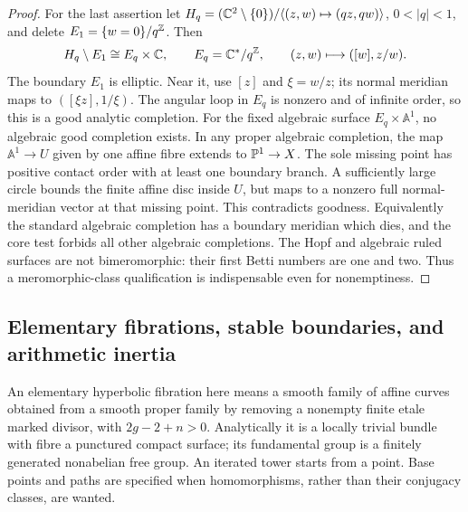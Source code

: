 \begin{proof}
For the last assertion let
$H_q=(\mathbb C^2\setminus\{0\})/\langle(z,w)\mapsto(qz,qw)\rangle$,
$0<|q|<1$, and delete $E_1=\{w=0\}/q^\mathbb Z$.
Then
\[
 H_q\setminus E_1\cong E_q\times\mathbb C,\qquad
 E_q=\mathbb C^*/q^\mathbb Z,\qquad
 (z,w)\longmapsto([w],z/w).
\]
The boundary $E_1$ is elliptic. Near it, use $[z]$ and
$\xi=w/z$; its normal meridian maps to
$([\xi z],1/\xi)$. The angular loop in $E_q$ is nonzero
and of infinite order, so this is a good analytic completion.
For the fixed algebraic surface $E_q\times\mathbb A^1$, no
algebraic good completion exists. In any proper algebraic
completion, the map $\mathbb A^1\to U$ given by one affine
fibre extends to $\mathbb P^1\to X$. The sole missing point has
positive contact order with at least one boundary branch.
A sufficiently large circle bounds the finite affine disc
inside $U$, but maps to a nonzero full normal-meridian
vector at that missing point. This contradicts goodness.
Equivalently the standard algebraic completion has a
boundary meridian which dies, and the core test forbids all
other algebraic completions. The Hopf and algebraic ruled
surfaces are not bimeromorphic: their first Betti numbers
are one and two. Thus a meromorphic-class qualification
is indispensable even for nonemptiness.
\end{proof}

\subsection{Elementary fibrations, stable boundaries, and arithmetic inertia}

An elementary hyperbolic fibration here means a smooth family of affine
curves obtained from a smooth proper family by removing a nonempty
finite etale marked divisor, with $2g-2+n>0$. Analytically it is a
locally trivial bundle with fibre a punctured compact surface; its
fundamental group is a finitely generated nonabelian free group.
An iterated tower starts from a point. Base points and paths are
specified when homomorphisms, rather than their conjugacy classes,
are wanted.

